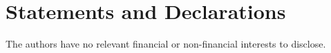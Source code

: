 \section*{Statements and Declarations}
\noindent The authors have no relevant financial or non-financial interests to disclose.
